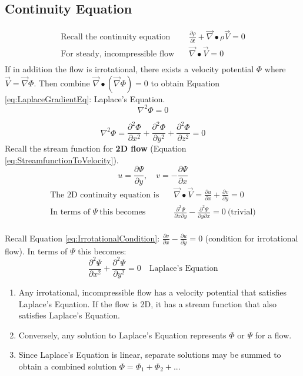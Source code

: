 \documentclass[draft=false, titlepage]{article}
\newcommand{\gradient}{\vec{\nabla}}
\newcommand{\partialfrac}[2]{\frac{\partial #1}{\partial #2}}
\begin{document}
\subsection{Continuity Equation}
\begin{align*}
    \text{Recall the continuity equation} \quad & \partialfrac{\rho}{t} + \gradient \bullet\rho \vec{V} = 0\\
    \text{For steady, incompressible flow} \quad & \gradient \bullet \vec{V} = 0\\
\end{align*}
If in addition the flow is irrotational, there exists a velocity potential $\Phi$ where $\vec{V} = \gradient \Phi$. Then combine $\gradient \bullet (\gradient \Phi) = 0$ to obtain Equation \ref{eq:LaplaceGradientEq}: Laplace's Equation.
\begin{equation}
    \boxed{\nabla^2 \Phi = 0}
    \label{eq:LaplaceGradientEq}
\end{equation}

\begin{equation*}
    \nabla^2 \Phi = \frac{\partial^2 \Phi}{\partial x^2} + \frac{\partial^2 \Phi}{\partial y^2} + \frac{\partial^2 \Phi}{\partial z^2} = 0
\end{equation*}
Recall the stream function for \textbf{2D flow} (Equation \ref{eq:StreamfunctionToVelocity}).
\begin{equation*}
    u = \partialfrac{\Psi}{y},\quad v = -\partialfrac{\Psi}{x}
\end{equation*}
\begin{align*}
    \text{The 2D continuity equation is} \quad &
    \gradient \bullet \vec{V} = \partialfrac{u}{x} + \partialfrac{v}{y} = 0\\
    \text{In terms of } \Psi\ \text{this becomes} \quad & \frac{\partial^2 \Psi}{\partial x \partial y} - \frac{\partial^2 \Psi}{\partial y \partial x} = 0\ \text{(trivial)}\\
\end{align*}

Recall Equation \ref{eq:IrrotationalCondition}: $\partialfrac{v}{x} - \partialfrac{u}{y} = 0$ (condition for irrotational flow). In terms of $\Psi$ this becomes:
\begin{equation*}
    \frac{\partial^2 \Psi}{\partial x^2} + \frac{\partial^2 \Psi}{\partial y^2} = 0\quad \text{Laplace's Equation}
\end{equation*}

\begin{enumerate}
    \item Any irrotational, incompressible flow has a velocity potential that satisfies Laplace's Equation. If the flow is 2D, it has a stream function that also satisfies Laplace's Equation.
    \item Conversely, any solution to Laplace's Equation represents $\Phi$ or $\Psi$ for a flow.
    \item Since Laplace's Equation is linear, separate solutions may be summed to obtain a combined solution $\Phi = \Phi_1 + \Phi_2 + ...$
\end{enumerate}
\end{document}
